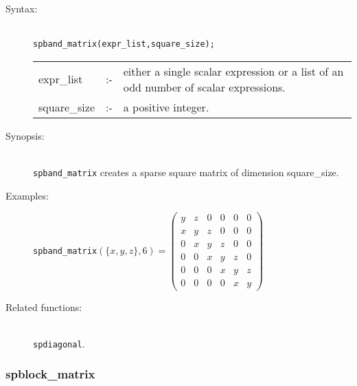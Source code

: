 \begin{description}
\item[Syntax:]\mbox{}\\
\texttt{spband\_matrix(expr\_list,square\_size);}\\[2mm]
\begin{tabular}{l l p{.72\linewidth}}
expr\_list  &:-&
either a single scalar expression or a list of an odd number of scalar
expressions.\\
square\_size &:-& a positive integer.
\end{tabular}

\item[Synopsis:]\mbox{}\\
                \texttt{spband\_matrix} creates a sparse square matrix of
                dimension square\_size.

\item[Examples:]
\texttt{spband\_matrix}\((\{x,y,z\},6) =
\begin{pmatrix} y & z & 0 & 0 & 0 & 0 \\ x & y & z & 0 & 0
& 0 \\ 0 & x & y & z & 0 & 0 \\ 0 & 0 & x & y & z & 0 \\ 0 & 0 & 0 & x &
 y & z \\ 0 & 0 & 0 & 0 & x & y
\end{pmatrix}\)

\item[Related functions:]\mbox{}\\
 \texttt{spdiagonal}.
\end{description}

\subsubsection{spblock\_matrix}
\label{sparse:spblock_matrix}
\hypertarget{operator:SPBLOCK_MATRIX}{}

